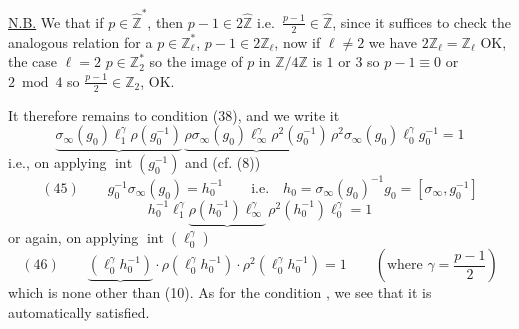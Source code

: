 \quad
\uline{N.B.} We  that if $p\in\widehat{\mathbb Z}^{*}$, then
$p-1\in 2\widehat{\mathbb Z}$ i.e.\ $\frac{p-1}{2}\in\widehat{\mathbb Z}$,
since it suffices to check the analogous relation for a $p\in\mathbb Z_\ell^{*}$,
 $p-1\in 2\mathbb Z_\ell$, now if $\ell\ne2$ we have
$2\mathbb Z_\ell=\mathbb Z_\ell$ OK,  the case $\ell=2$
$p\in\mathbb Z_2^{*}$ so the image of $p$ in $\mathbb Z/4\mathbb Z$
is $1$ or $3$ so $p-1\equiv0$ or $2\bmod4$
 so $\frac{p-1}{2}\in\mathbb Z_2$, OK.

\par
It therefore remains to  condition (38), and we write it
\[
\underbrace{\sigma_\infty(g_0)\ell_1^\gamma\rho(g_0^{-1})}\,
\underbrace{\rho\sigma_\infty(g_0)\ell_\infty^\gamma\rho^2(g_0^{-1})}\,
\rho^2\sigma_\infty(g_0)\ell_0^\gamma g_0^{-1}=1
\]
i.e., on applying $\operatorname{int}(g_0^{-1})$ and
(cf. (8))
\[
(45)\qquad g_0^{-1}\sigma_\infty(g_0)=h_0^{-1}
\qquad\text{i.e.}\quad
h_0=\sigma_\infty(g_0)^{-1}g_0=[\sigma_\infty,g_0^{-1}]
\]
\[
h_0^{-1}\ell_1^\gamma\underbrace{\rho(h_0^{-1})\ell_\infty^\gamma}\,
\rho^2(h_0^{-1})\ell_0^\gamma=1
\]
or again, on applying $\operatorname{int}(\ell_0^\gamma)$
\[
(46)\qquad
\boxed{\underbrace{(\ell_0^\gamma h_0^{-1})}\cdot
\rho(\ell_0^\gamma h_0^{-1})\cdot\rho^2(\ell_0^\gamma h_0^{-1})=1}
\qquad\left(\text{where }\gamma=\frac{p-1}{2}\right)
\]
which is none other than (10). As for the condition ,
we see that it is  automatically satisfied.